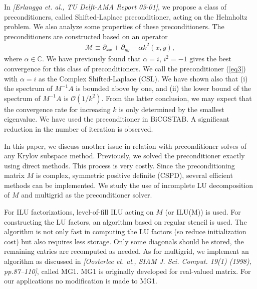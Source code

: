 \documentclass{report}
\begin{document}
In {\it [Erlangga et. al., TU Delft-AMA Report 03-01]}, we propose a
class of preconditioners, called Shifted-Laplace preconditioner, acting
on the Helmholtz problem. We also analyze some properties of these
preconditioners. The preconditioners are constructed based on an operator
\begin{eqnarray}
\mathcal{M} \equiv \partial_{xx} + \partial_{yy} - \alpha k^2(x,y), \label{eq3}
\end{eqnarray}
where $\alpha \in \mathbb{C}$. We have previously found that $\alpha =
i$, $i^2 = -1$ gives the best convergence for this class of
preconditioners. We call the preconditioner (\ref{eq3}) with $\alpha = i$
as the Complex Shifted-Laplace (CSL). We have shown also that (i) the
spectrum of $M^{-1}A$ is bounded above by one, and (ii) the lower bound
of the spectrum of $M^{-1}A$ is $\mathcal{O}(1/k^2)$. From the latter
conclusion, we may expect that the convergence rate for increasing $k$ is
only determined by the smallest eigenvalue. We have used the
preconditioner in BiCGSTAB. A significant reduction in the number of
iteration is observed.

In this paper, we discuss another issue in relation with preconditioner
solves of any Krylov subspace method. Previously, we solved the
preconditioner exactly using direct methods. This process is very costly.
Since the preconditioning matrix $M$ is complex, symmetric positive
definite (CSPD), several efficient methods can be implemented. We study
the use of incomplete LU decomposition of $M$ and multigrid as the
preconditioner solver.

For ILU factorizations, level-of-fill ILU acting on $M$ (or ILU(M)) is
used. For constructing the LU factors, an algorithm based on regular
stencil is used. The algorithm is not only fast in computing the LU
factors (so reduce initialization cost) but also requires less storage.
Only some diagonals should be stored, the remaining entries are
recomputed as needed. As for multigrid, we implement an algorithm as
discussed in {\it [Oosterlee et. al., SIAM J. Sci. Comput. 19(1) (1998),
pp.87--110]}, called MG1. MG1 is originally developed for real-valued
matrix. For our applications no modification is made to MG1.
\end{document}
